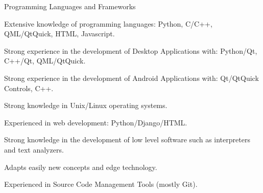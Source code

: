 

\begin{cventries}

  \cventry
    {Programming Languages and Frameworks} %
    {} %
    {} %
    {} %
    {
      \begin{cvitems} %
        \item {Extensive knowledge of programming languages: Python, C/C++, QML/QtQuick, HTML, Javascript.}
        \item {Strong experience in the development of Desktop Applications with: Python/Qt, C++/Qt, QML/QtQuick.}
        \item {Strong experience in the development of Android Applications with: Qt/QtQuick Controls, C++.}
        \item {Strong knowledge in Unix/Linux operating systems.}
        \item {Experienced in web development: Python/Django/HTML.}
        \item {Strong knowledge in the development of low level software such as interpreters and text analyzers.}
        \item {Adapts easily new concepts and edge technology.}
        \item {Experienced in Source Code Management Tools (mostly Git).}
      \end{cvitems}
    }

\end{cventries}
